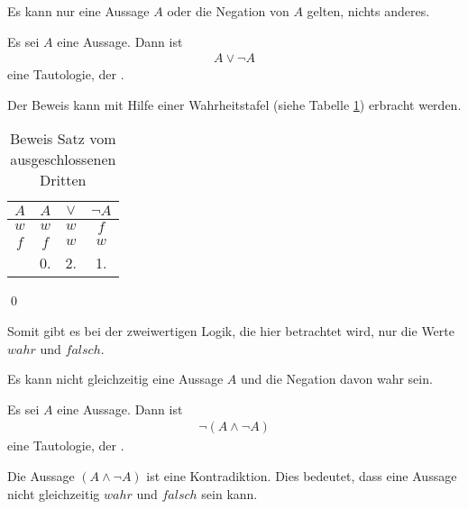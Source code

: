 \begin{Unit}
Es kann nur eine Aussage $A$ oder die Negation von $A$ gelten, nichts 
anderes. 

\begin{Satz}
Es sei $A$ eine Aussage. Dann ist 
\begin{align}
  A \lor \neg A
\end{align}
eine Tautologie, der .
\end{Satz}

Der Beweis kann mit Hilfe einer Wahrheitstafel (siehe Tabelle 
\ref{tbl:Beweis Satz vom ausgeschlossenen Dritten}) erbracht werden.

\begin{table}[htbp]
\begin{center}
\begin{tabular}{c||c|c|c}
  $A$ & $A$  & $\lor$ & $\neg A$ \\  \hline
  $w$ & $w$  & $w$  & $f$      \\
  $f$ & $f$  & $w$  & $w$      \\  \hline
    & 0. & 2. & 1.     \\
\end{tabular}
\caption{Beweis Satz vom ausgeschlossenen Dritten}
\label{tbl:Beweis Satz vom ausgeschlossenen Dritten}
\end{center}
\end{table} 
\qed

Somit gibt es bei der zweiwertigen Logik, die hier betrachtet wird, nur die 
Werte $wahr$ und $falsch$.
\end{Unit}

\begin{Unit}
\label{satz:Aus-SatzVomWiderspruch}
Es kann nicht gleichzeitig eine Aussage $A$ und die Negation davon wahr sein. 

\begin{Satz} 
Es sei $A$ eine Aussage. Dann ist
\begin{align}
  \neg (A \land \neg A)
\end{align}
eine Tautologie, der . 
\end{Satz}

Die Aussage $( A \land \neg A)$ ist eine Kontradiktion. Dies bedeutet, dass 
eine Aussage nicht gleichzeitig $wahr$ und $falsch$ sein kann.
\end{Unit}

